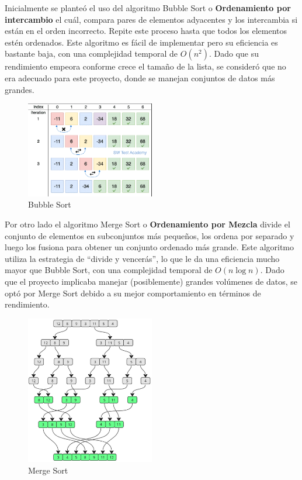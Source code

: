 Inicialmente se planteó el uso del algoritmo Bubble Sort o \textbf{Ordenamiento por intercambio} el cuál, compara pares de elementos adyacentes y los intercambia si están en el orden incorrecto. Repite este proceso hasta que todos los elementos estén ordenados. Este algoritmo es fácil de implementar pero su eficiencia es bastante baja, con una complejidad temporal de $O(n^2)$. Dado que su rendimiento empeora conforme crece el tamaño de la lista, se consideró que no era adecuado para este proyecto, donde se manejan conjuntos de datos más grandes.
\begin{figure}[H]
    \centering
    \includegraphics[width=0.5\textwidth]{./src/images/BubbleSort.png}
    \caption{Bubble Sort}
    \label{fig:BubbleSort}
\end{figure}
\newpage
Por otro lado el algoritmo Merge Sort o \textbf{Ordenamiento por Mezcla} divide el conjunto de elementos en subconjuntos más pequeños, los ordena por separado y luego los fusiona para obtener un conjunto ordenado más grande. Este algoritmo utiliza la estrategia de ``divide y vencerás'', lo que le da una eficiencia mucho mayor que Bubble Sort, con una complejidad temporal de $O(n \log n)$. Dado que el proyecto implicaba manejar (posiblemente) grandes volúmenes de datos, se optó por Merge Sort debido a su mejor comportamiento en términos de rendimiento.
\begin{figure}[H]
    \centering
    \includegraphics[width=0.5\textwidth]{./src/images/MergeSort.png}
    \caption{Merge Sort}
    \label{fig:MergeSort}
\end{figure}
\newpage
